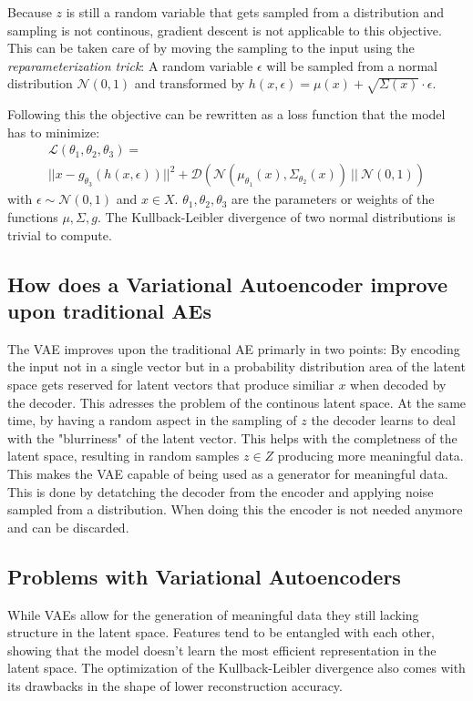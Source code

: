 \documentclass[a4paper]{IEEEtran}
\begin{document}
Because $z$ is still a random variable that gets sampled from a distribution and sampling is not continous, gradient descent is not applicable to this objective. This can be taken care of by moving the sampling to the input using the \textit{reparameterization trick}: A random variable $\epsilon$ will be sampled from a normal distribution $\mathcal{N}(0,1)$ and transformed by $h(x, \epsilon) = \mu(x) + \sqrt{\Sigma(x)} \cdot \epsilon$. 

Following this the objective can be rewritten as a loss function that the model has to minimize:
\begin{gather}
	\mathcal{L}(\theta_1, \theta_2, \theta_3) = \\ 
	||x - g_{\theta_3}(h(x, \epsilon))||^2 + \mathcal{D}(\mathcal{N}(\mu_{\theta_1}(x), \Sigma_{\theta_2}(x)) \ || \ \mathcal{N}(0, 1))
	\label{vae_loss}
\end{gather}
with $\epsilon \sim \mathcal{N}(0,1)$ and $x \in X$. $\theta_1, \theta_2, \theta_3$ are the parameters or weights of the functions $\mu, \Sigma, g$. The Kullback-Leibler divergence of two normal distributions is trivial to compute.

\subsection{How does a Variational Autoencoder improve upon traditional AEs}
The VAE improves upon the traditional AE primarly in two points:
By encoding the input not in a single vector but in a probability distribution area of the latent space gets reserved for latent vectors that produce similiar $x$ when decoded by the decoder. This adresses the problem of the continous latent space. At the same time, by having a random aspect in the sampling of $z$ the decoder learns to deal with the "blurriness" of the latent vector. This helps with the completness of the latent space, resulting in random samples $z \in Z$ producing more meaningful data. This makes the VAE capable of being used as a generator for meaningful data. This is done by detatching the decoder from the encoder and applying noise sampled from a distribution. When doing this the encoder is not needed anymore and can be discarded.

\subsection{Problems with Variational Autoencoders}
While VAEs allow for the generation of meaningful data they still lacking structure in the latent space. Features tend to be entangled with each other, showing that the model doesn't learn the most efficient representation in the latent space. The optimization of the Kullback-Leibler divergence also comes with its drawbacks in the shape of lower reconstruction accuracy. 
\end{document}
